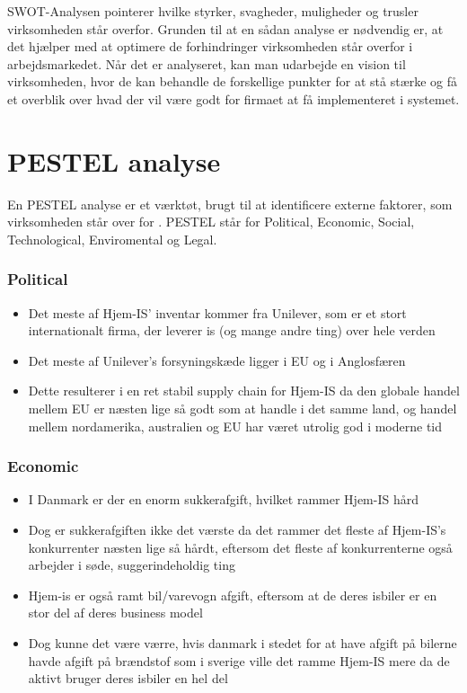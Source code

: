 SWOT-Analysen pointerer hvilke styrker, svagheder, muligheder og trusler virksomheden står overfor. Grunden til at en sådan analyse er nødvendig er, at det hjælper med at optimere de forhindringer virksomheden står overfor i arbejdsmarkedet. Når det er analyseret, kan man udarbejde en vision til virksomheden, hvor de kan behandle de forskellige punkter for at stå stærke og få et overblik over hvad der vil være godt for firmaet at få implementeret i systemet.

\section{PESTEL analyse}
En PESTEL analyse er et værktøt, brugt til at identificere externe faktorer, som virksomheden står over for \cite{Oxford}. PESTEL står for Political, Economic, Social, Technological, Enviromental og Legal. 
\subsubsection{Political}
\begin{itemize}
    \item Det meste af Hjem-IS’ inventar kommer fra Unilever, som er et stort internationalt firma, der leverer is (og mange andre ting) over hele verden
    \item Det meste af Unilever’s forsyningskæde ligger i EU og i Anglosfæren
    \item Dette resulterer i en ret stabil supply chain for Hjem-IS da den globale handel mellem EU er næsten lige så godt som at handle i det samme land, og handel mellem nordamerika, australien og EU har været utrolig god i moderne tid
\end{itemize}
\subsubsection{Economic}
\begin{itemize}
    \item I Danmark er der en enorm sukkerafgift, hvilket rammer Hjem-IS hård
    \item Dog er sukkerafgiften ikke det værste da det rammer det fleste af Hjem-IS’s konkurrenter næsten lige så hårdt, eftersom det fleste af konkurrenterne også arbejder i søde, suggerindeholdig ting
    \item Hjem-is er også ramt bil/varevogn afgift, eftersom at de deres isbiler er en stor del af deres business model
    \item Dog kunne det være værre, hvis danmark i stedet for at have afgift på bilerne havde afgift på brændstof som i sverige ville det ramme Hjem-IS mere da de aktivt bruger deres isbiler en hel del
\end{itemize}
